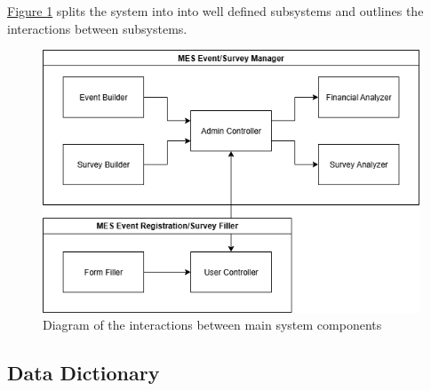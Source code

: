 \documentclass[12pt]{article}
\begin{document}
\hyperref[fig:businessdata]{Figure \ref{fig:businessdata}} splits the system into into well defined subsystems and outlines the interactions between subsystems.

\begin{center}
\begin{figure}[H]
    \centering
    \includegraphics[width=1\linewidth]{images/business_data_model.png}
    \caption{Diagram of the interactions between main system components}\label{fig:businessdata}
\end{figure}
\end{center}
\subsection{Data Dictionary}
\end{document}
